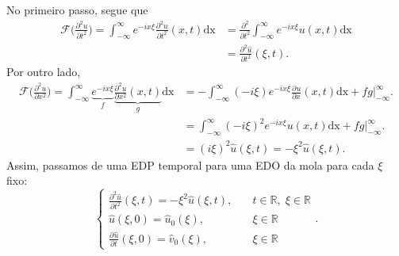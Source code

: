 \documentclass[../pde_notes.tex]{subfiles}
\begin{document}
No primeiro passo, segue que
\begin{align*}
	\mathcal{F}\biggl(\frac{\partial^{2}u}{\partial t^{2}}\biggr) = \int_{-\infty}^{\infty}e^{-ix\xi }\frac{\partial^{2}u}{\partial t^{2}}(x, t) \mathrm{dx} & = \frac{\partial^{2}}{\partial t^{2}}\int_{-\infty}^{\infty}e^{-ix\xi }u(x, t) \mathrm{dx} \\
	                                                                                                                                                         & = \frac{\partial^{2}\hat{u}}{\partial t^{2}}(\xi , t).
\end{align*}
Por outro lado,
\begin{align*}
	\mathcal{F}\biggl(\frac{\partial^{2}u}{\partial x^{2}}\biggr) = \int_{-\infty}^{\infty}\underbrace{e^{-ix\xi }}_{f}\underbrace{\frac{\partial^{2}u}{\partial x^{2}}(x, t)}_{g} \mathrm{dx} & =-\int_{-\infty}^{\infty}(-i\xi )e^{-ix\xi }\frac{\partial^{}u}{\partial x^{}}(x, t) \mathrm{dx} + fg \biggl|_{-\infty}^{\infty}\biggr. \\
	                                                                                                                                                                                           & = \int_{-\infty}^{\infty}(-i\xi )^{2}e^{-ix\xi }u(x, t) \mathrm{dx} + fg \biggl|_{-\infty}^{\infty}\biggr.                              \\
	                                                                                                                                                                                           & = (i\xi )^{2}\hat{u}(\xi , t) = -\xi^{2}\hat{u}(\xi , t).
\end{align*}
Assim, passamos de uma EDP temporal para uma EDO da mola para cada \(\xi \) fixo:
\[
	\left\{\begin{array}{ll}
		\frac{\partial^{2}\hat{u}}{\partial t^{2}}(\xi , t) = -\xi^{2}\hat{u}(\xi , t), & \quad t\in \mathbb{R},\; \xi \in \mathbb{R} \\
		\hat{u}(\xi , 0) = \hat{u}_{0}(\xi ),                                           & \quad \xi \in \mathbb{R}                    \\
		\frac{\partial^{}\hat{u}}{\partial t^{}}(\xi , 0) = \hat{v}_{0}(\xi ),          & \quad \xi \in \mathbb{R}
	\end{array}\right..
\]
\end{document}
